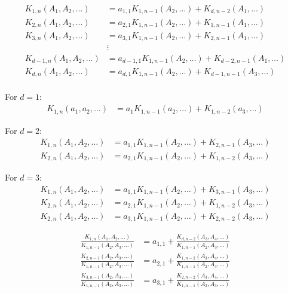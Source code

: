 \documentclass[english,version-2020-11]{uzl-thesis}
\begin{document}
\begin{align*}
  K_{1,n}(A_1, A_2, \dots)   & = a_{1,1}   K_{1,n-1}(A_2, \dots) + K_{d,n-2}(A_1, \dots)   \\
  K_{2,n}(A_1, A_2, \dots)   & = a_{2,1}   K_{1,n-1}(A_2, \dots) + K_{1,n-1}(A_1, \dots)     \\
  K_{3,n}(A_1, A_2, \dots)   & = a_{3,1}   K_{1,n-1}(A_2, \dots) + K_{2,n-1}(A_1, \dots)     \\
                             & \vdots                                                        \\
  K_{d-1,n}(A_1, A_2, \dots) & = a_{d-1,1} K_{1,n-1}(A_2, \dots) + K_{d-2,n-1}(A_1, \dots) \\
  K_{d,n}(A_1, A_2, \dots)   & = a_{d,1}   K_{1,n-1}(A_2, \dots) + K_{d-1,n-1}(A_3, \dots)     \\
\end{align*}

For $d = 1$:
\begin{align*}
  K_{1,n}(a_1, a_2, \dots) & = a_1 K_{1,n-1}(a_2, \dots) + K_{1,n-2}(a_3, \dots)
\end{align*}

For $d = 2$:
\begin{align*}
  K_{1,n}(A_1, A_2, \dots) & = a_{1,1} K_{1,n-1}(A_2, \dots) + K_{2,n-1}(A_3, \dots) \\
  K_{2,n}(A_1, A_2, \dots) & = a_{2,1} K_{1,n-1}(A_2, \dots) + K_{1,n-2}(A_3, \dots)
\end{align*}

For $d = 3$:
\begin{align*}
  K_{1,n}(A_1, A_2, \dots) & = a_{1,1} K_{1,n-1}(A_2, \dots) + K_{3,n-1}(A_3, \dots) \\
  K_{2,n}(A_1, A_2, \dots) & = a_{2,1} K_{1,n-1}(A_2, \dots) + K_{1,n-2}(A_3, \dots) \\
  K_{2,n}(A_1, A_2, \dots) & = a_{3,1} K_{1,n-1}(A_2, \dots) + K_{2,n-2}(A_3, \dots)
\end{align*}

\begin{align*}
  \frac{K_{1,n}(A_1, A_2, \dots)}{K_{1,n-1}(A_2, A_3, \dots)}
  & = a_{1,1} + \frac{K_{d,n-2}(A_3, A_4, \dots)}{K_{1,n-1}(A_2, A_3, \dots)} \\
  \frac{K_{2,n-1}(A_2, A_3, \dots)}{K_{1,n-1}(A_2, A_3, \dots)}
  & = a_{2,1} + \frac{K_{1,n-2}(A_3, A_4, \dots)}{K_{1,n-1}(A_2, A_3, \dots)} \\
  \frac{K_{3,n-1}(A_2, A_3, \dots)}{K_{1,n-1}(A_2, A_3, \dots)}
  & = a_{3,1} + \frac{K_{2,n-2}(A_3, A_4, \dots)}{K_{1,n-1}(A_2, A_3, \dots)}
\end{align*}
\end{document}
